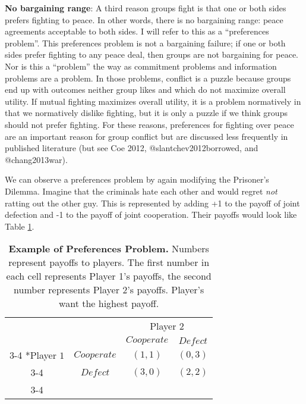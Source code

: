 \documentclass[11pt]{article}
\begin{document}
\noindent \textbf{No bargaining range}: A third reason groups fight is
that one or both sides prefers fighting to peace. In other words, there
is no bargaining range: peace agreements acceptable to both sides. I
will refer to this as a ``preferences problem''. This preferences
problem is not a bargaining failure; if one or both sides prefer
fighting to any peace deal, then groups are not bargaining for peace.
Nor is this a ``problem'' the way as commitment problems and information
problems are a problem. In those problems, conflict is a puzzle because
groups end up with outcomes neither group likes and which do not
maximize overall utility. If mutual fighting maximizes overall utility,
it is a problem normatively in that we normatively dislike fighting, but
it is only a puzzle if we think groups should not prefer fighting. For
these reasons, preferences for fighting over peace are an important
reason for group conflict but are discussed less frequently in published
literature (but see Coe 2012, @slantchev2012borrowed, and
@chang2013war).

We can observe a preferences problem by again modifying the Prisoner's
Dilemma. Imagine that the criminals hate each other and would regret
\emph{not} ratting out the other guy. This is represented by adding +1
to the payoff of joint defection and -1 to the payoff of joint
cooperation. Their payoffs would look like Table \ref{tab:prefProb}.

\begin{table}[h!]
\begin{center}
\setlength{\extrarowheight}{2pt}
\begin{tabular}{cc|c|c|}
    & \multicolumn{1}{c}{} & \multicolumn{2}{c}{Player $2$}\\
    & \multicolumn{1}{c}{} & \multicolumn{1}{c}{$Cooperate$}  & \multicolumn{1}{c}{$Defect$} \\\cline{3-4}
    \multirow{2}*{Player $1$}  & $Cooperate$ & $(1,1)$ & $(0,3)$ \\\cline{3-4}
      & $Defect$ & $(3,0)$ & $(2,2)$ \\\cline{3-4}
\end{tabular}
\caption{\label{tab:prefProb}\textbf{Example of Preferences Problem.} Numbers represent payoffs to players.  The first number in each cell represents Player 1's payoffs, the second number represents Player 2's payoffs.  Player's want the highest payoff.}
\end{center}
\end{table}
\end{document}
